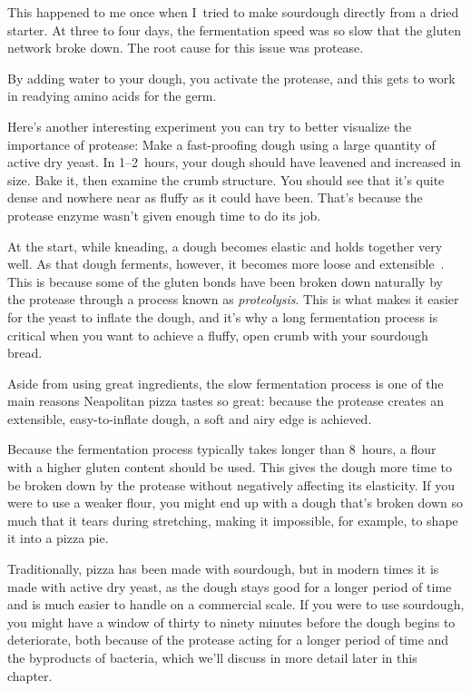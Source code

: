This happened to me once when I~tried to make sourdough directly from a dried
starter. At three to four days, the fermentation speed was so slow that the
gluten network broke down. The root cause for this issue was protease.

By adding water to your dough, you activate the protease, and this gets to work
in readying amino acids for the germ.

Here's another interesting experiment you can try to better visualize the
importance of protease: Make a fast-proofing dough using a large quantity
of active dry yeast. In 1--2~hours, your dough should have leavened and
increased in size. Bake it, then examine the crumb structure. You should see
that it's quite dense and nowhere near as fluffy as it could have been. That's
because the protease enzyme wasn't given enough time to do its job.

At the start, while kneading, a dough becomes elastic and holds together very
well. As that dough ferments, however, it becomes more loose and
extensible~\cite{protease+enzyme+bread}. This is because some of the gluten
bonds have
been broken down naturally by the protease through a process known as
\emph{proteolysis}. This is what makes it easier for the yeast to inflate the
dough, and it's why a long fermentation process is critical when you want to
achieve a fluffy, open crumb with your sourdough bread.

Aside from using great ingredients, the slow fermentation process is one of the
main reasons Neapolitan pizza tastes so great: because the protease creates an
extensible, easy-to-inflate dough, a soft and airy edge is achieved.

Because the fermentation process typically takes longer than 8~hours, a
flour with a higher gluten content should be used. This gives the dough more
time to be broken down by the protease without negatively affecting its
elasticity. If you were to use a weaker flour, you might end up with a dough
that's broken down so much that it tears during stretching, making it
impossible, for example, to shape it into a pizza pie.

Traditionally, pizza has been made with sourdough, but in modern times it is
made with active dry yeast, as the dough stays good for a longer period of time
and is much easier to handle on a commercial scale. If you were to use
sourdough, you might have a window of thirty to ninety minutes before the dough
begins to deteriorate, both because of the protease acting for a longer period
of time and the byproducts of bacteria, which we'll discuss in more detail later
in this chapter.

